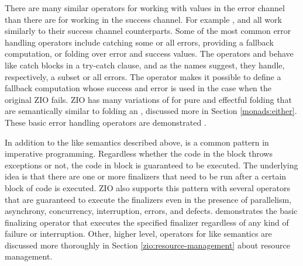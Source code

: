 There are many similar operators for working with values in the error channel than there are for working in the success channel. For example ,  and  all work similarly to their success channel counterparts. Some of the most common error handling operators include catching some or all errors, providing a fallback computation, or folding over error and success values. The operators  and  behave like catch blocks in a try-catch clause, and as the names suggest, they handle, respectively, a subset or all errors. The  operator makes it possible to define a fallback computation whose success and error is used in the case when the original ZIO fails. ZIO has many variations of  for pure and effectful folding that are semantically similar to folding an , discussed more in Section \ref{monads:either}. These basic error handling operators are demonstrated .



In addition to the  like semantics described above,  is a common pattern in imperative programming. Regardless whether the code in the  block throws exceptions or not, the code in  block is guaranteed to be executed. The underlying idea is that there are one or more finalizers that need to be run after a certain block of code is executed. ZIO also supports this pattern with several operators that are guaranteed to execute the finalizers even in the presence of parallelism, asynchrony, concurrency, interruption, errors, and defects.  demonstrates the basic finalizing operator  that executes the specified finalizer regardless of any kind of failure or interruption. Other, higher level, operators for  like semantics are discussed more thoroughly in Section \ref{zio:resource-management} about resource management.



